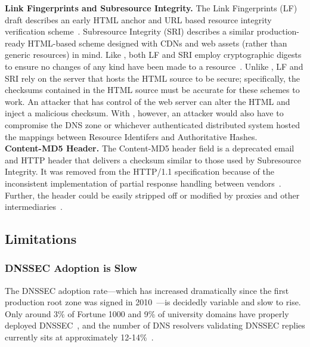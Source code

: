 \noindent\textbf{Link Fingerprints and Subresource Integrity.} The Link
Fingerprints (LF) draft describes an early HTML anchor and URL based resource
integrity verification scheme~\cite{LF}. Subresource Integrity (SRI) describes a
similar production-ready HTML-based scheme designed with CDNs and web assets
(rather than generic resources) in mind. Like \SYSTEM{}, both LF and SRI employ
cryptographic digests to ensure no changes of any kind have been made to a
resource~\cite{SRI}. Unlike \SYSTEM{}, LF and SRI rely on the server that hosts
the HTML source to be secure; specifically, the checksums contained in the HTML
source must be accurate for these schemes to work. An attacker that has control
of the web server can alter the HTML and inject a malicious checksum. With
\SYSTEM{}, however, an attacker would also have to compromise the DNS zone or
whichever authenticated distributed system hosted the mappings between Resource
Identifers and Authoritative Hashes. \\

\noindent\textbf{Content-MD5 Header.} The Content-MD5 header field is a
deprecated email and HTTP header that delivers a checksum similar to those used
by Subresource Integrity. It was removed from the HTTP/1.1 specification because
of the inconsistent implementation of partial response handling between
vendors~\cite{HTTP1.1}. Further, the header could be easily stripped off or
modified by proxies and other intermediaries~\cite{MD5Header}.

\subsection{Limitations}

\subsubsection{DNSSEC Adoption is Slow}

The DNSSEC adoption rate---which has increased dramatically since the first
production root zone was signed in 2010~\cite{Cloudflare, APNIC}---is decidedly
variable and slow to rise. Only around 3\% of Fortune 1000 and 9\% of university
domains have properly deployed DNSSEC~\cite{NIST-IPv6}, and the number of DNS
resolvers validating DNSSEC replies currently sits at approximately
12-14\%~\cite{APNIC}.


